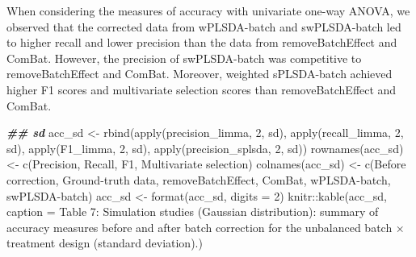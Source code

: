 \documentclass[
]{book}
\newenvironment{Shaded}{\begin{snugshade}}{\end{snugshade}}
\newcommand{\AttributeTok}[1]{\textcolor[rgb]{0.77,0.63,0.00}{#1}}
\newcommand{\DecValTok}[1]{\textcolor[rgb]{0.00,0.00,0.81}{#1}}
\newcommand{\DocumentationTok}[1]{\textcolor[rgb]{0.56,0.35,0.01}{\textbf{\textit{#1}}}}
\newcommand{\FunctionTok}[1]{\textcolor[rgb]{0.00,0.00,0.00}{#1}}
\newcommand{\NormalTok}[1]{#1}
\newcommand{\OtherTok}[1]{\textcolor[rgb]{0.56,0.35,0.01}{#1}}
\newcommand{\SpecialCharTok}[1]{\textcolor[rgb]{0.00,0.00,0.00}{#1}}
\newcommand{\StringTok}[1]{\textcolor[rgb]{0.31,0.60,0.02}{#1}}
\begin{document}
When considering the measures of accuracy with univariate one-way ANOVA, we observed that the corrected data from wPLSDA-batch and swPLSDA-batch led to higher recall and lower precision than the data from removeBatchEffect and ComBat. However, the precision of swPLSDA-batch was competitive to removeBatchEffect and ComBat. Moreover, weighted sPLSDA-batch achieved higher F1 scores and multivariate selection scores than removeBatchEffect and ComBat.

\begin{Shaded}
\begin{Highlighting}[]
\DocumentationTok{\#\# sd}
\NormalTok{acc\_sd }\OtherTok{\textless{}{-}} \FunctionTok{rbind}\NormalTok{(}\FunctionTok{apply}\NormalTok{(precision\_limma, }\DecValTok{2}\NormalTok{, sd), }\FunctionTok{apply}\NormalTok{(recall\_limma, }\DecValTok{2}\NormalTok{, sd), }
                \FunctionTok{apply}\NormalTok{(F1\_limma, }\DecValTok{2}\NormalTok{, sd), }\FunctionTok{apply}\NormalTok{(precision\_splsda, }\DecValTok{2}\NormalTok{, sd))}
\FunctionTok{rownames}\NormalTok{(acc\_sd) }\OtherTok{\textless{}{-}} \FunctionTok{c}\NormalTok{(}\StringTok{\textquotesingle{}Precision\textquotesingle{}}\NormalTok{, }\StringTok{\textquotesingle{}Recall\textquotesingle{}}\NormalTok{, }\StringTok{\textquotesingle{}F1\textquotesingle{}}\NormalTok{, }\StringTok{\textquotesingle{}Multivariate selection\textquotesingle{}}\NormalTok{)}
\FunctionTok{colnames}\NormalTok{(acc\_sd) }\OtherTok{\textless{}{-}} \FunctionTok{c}\NormalTok{(}\StringTok{\textquotesingle{}Before correction\textquotesingle{}}\NormalTok{, }\StringTok{\textquotesingle{}Ground{-}truth data\textquotesingle{}}\NormalTok{, }
                      \StringTok{\textquotesingle{}removeBatchEffect\textquotesingle{}}\NormalTok{, }\StringTok{\textquotesingle{}ComBat\textquotesingle{}}\NormalTok{, }
                      \StringTok{\textquotesingle{}wPLSDA{-}batch\textquotesingle{}}\NormalTok{, }\StringTok{\textquotesingle{}swPLSDA{-}batch\textquotesingle{}}\NormalTok{)}
\NormalTok{acc\_sd }\OtherTok{\textless{}{-}} \FunctionTok{format}\NormalTok{(acc\_sd, }\AttributeTok{digits =} \DecValTok{2}\NormalTok{)}
\NormalTok{knitr}\SpecialCharTok{::}\FunctionTok{kable}\NormalTok{(acc\_sd, }\AttributeTok{caption =} \StringTok{\textquotesingle{}Table 7: Simulation studies (Gaussian distribution): summary of accuracy measures before and after batch correction for the unbalanced batch × treatment design (standard deviation).\textquotesingle{}}\NormalTok{)}
\end{Highlighting}
\end{Shaded}
\end{document}
